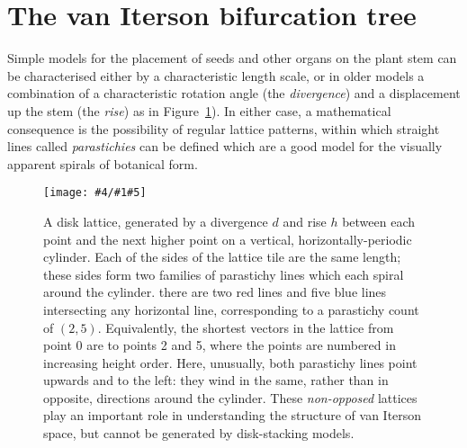 \documentclass[a4paper,10pt]{amsart}
\newlength{\jfigwidth}
\newcommand{\pdffig}[3]{\jdofig{#1}{#2}{#3}{Figures}{.pdf}}
\newcommand{\jdofig}[5]{
	\begin{figure}\centering\texttt{[image: \#4/\#1\#5]} \caption{#2}\label{fig:#1}\end{figure}
}
\begin{document}
\section{The van Iterson bifurcation tree}
  Simple models for the placement of seeds and other organs on the plant stem can be characterised either by a characteristic length scale, or in older models a combination of a characteristic rotation angle (the \textit{divergence}) and a displacement up the stem (the \textit{rise}) as in  Figure~\ref{fig:scpNonOpposed}). In either case, a mathematical consequence is the possibility of regular lattice patterns, within which straight lines called \textit{parastichies} can be defined which are a good model for the visually apparent spirals of botanical form.
 \pdffig{scpNonOpposed}{A disk lattice, generated by a divergence $d$ and rise $h$ between each point and the next higher point on a vertical, horizontally-periodic cylinder. Each of the sides of the lattice tile are the same length; these sides form two families of parastichy lines which each spiral around the cylinder. there are two red lines and five blue lines intersecting any horizontal line, corresponding to a parastichy count of $(2,5)$. Equivalently, the shortest vectors in the lattice from point 0 are to points 2 and 5, where the points are numbered in increasing height order. Here, unusually, both parastichy lines point upwards and to the left: they wind in the same, rather than in  opposite, directions around the cylinder.  These \textit{non-opposed} lattices play an important role in understanding the structure of van Iterson space, but cannot be generated by disk-stacking models.
 }{1}%
\end{document}
